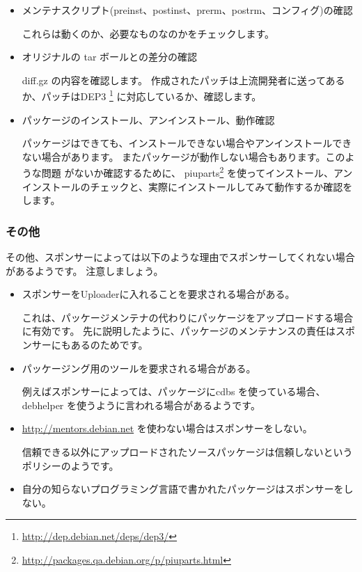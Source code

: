\documentclass[mingoth,a4paper]{jsarticle}
\begin{document}
\begin{itemize}
パッケージが Debian ポリシー に準拠しているか簡単に確認するには
lintian\footnote{\url{http://packages.qa.debian.org/l/lintian.html}} を使います。
これはDebian ポリシー の他に Debian パッケージのよくある間違いに関してチェックしてくれます。

\item メンテナスクリプト(preinst、postinst、prerm、postrm、コンフィグ)の確認

これらは動くのか、必要なものなのかをチェックします。

\item オリジナルの tar ボールとの差分の確認

diff.gz の内容を確認します。
作成されたパッチは上流開発者に送ってあるか、パッチはDEP3
\footnote{\url{http://dep.debian.net/deps/dep3/}}
に対応しているか、確認します。

\item パッケージのインストール、アンインストール、動作確認

パッケージはできても、インストールできない場合やアンインストールできない場合があります。
またパッケージが動作しない場合もあります。このような問題
がないか確認するために、
piuparts\footnote{\url{http://packages.qa.debian.org/p/piuparts.html}} を使ってインストール、アンインストールのチェックと、実際にインストールしてみて動作するか確認をします。

\end{itemize}

\subsubsection{その他}
その他、スポンサーによっては以下のような理由でスポンサーしてくれない場合があるようです。
注意しましょう。

\begin{itemize}

\item スポンサーをUploaderに入れることを要求される場合がある。

これは、パッケージメンテナの代わりにパッケージをアップロードする場合に有効です。
先に説明したように、パッケージのメンテナンスの責任はスポンサーにもあるのためです。

\item パッケージング用のツールを要求される場合がある。

例えばスポンサーによっては、パッケージにcdbs を使っている場合、debhelper を使うように言われる場合があるようです。

\item \url{http://mentors.debian.net} を使わない場合はスポンサーをしない。

信頼できる以外にアップロードされたソースパッケージは信頼しないというポリシーのようです。

\item 自分の知らないプログラミング言語で書かれたパッケージはスポンサーをしない。

\end{itemize}
\end{document}
